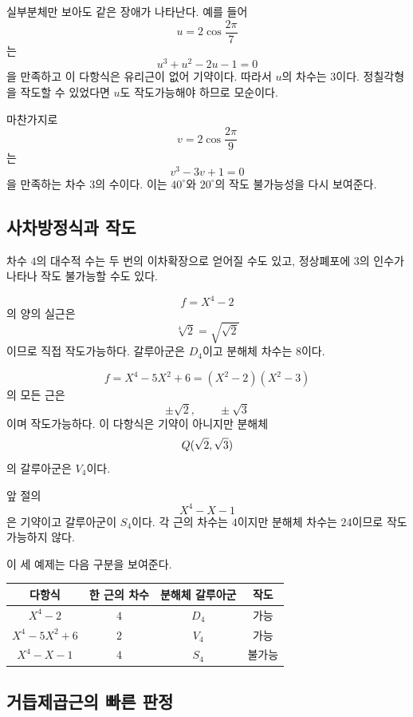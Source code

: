 실부분체만 보아도 같은 장애가 나타난다. 예를 들어
\[
  u=2\cos\frac{2\pi}{7}
\]
는
\[
  u^3+u^2-2u-1=0
\]
을 만족하고 이 다항식은 유리근이 없어 기약이다. 따라서 $u$의 차수는 $3$이다. 정칠각형을 작도할 수 있었다면 $u$도 작도가능해야 하므로 모순이다.

마찬가지로
\[
  v=2\cos\frac{2\pi}{9}
\]
는
\[
  v^3-3v+1=0
\]
을 만족하는 차수 $3$의 수이다. 이는 $40^\circ$와 $20^\circ$의 작도 불가능성을 다시 보여준다.

\subsection{사차방정식과 작도}

차수 $4$의 대수적 수는 두 번의 이차확장으로 얻어질 수도 있고, 정상폐포에 $3$의 인수가 나타나 작도 불가능할 수도 있다.

\begin{example}
\[
  f=X^4-2
\]
의 양의 실근은
\[
  \sqrt[4]2=\sqrt{\sqrt2}
\]
이므로 직접 작도가능하다. 갈루아군은 $D_4$이고 분해체 차수는 $8$이다.
\end{example}

\begin{example}
\[
  f=X^4-5X^2+6=(X^2-2)(X^2-3)
\]
의 모든 근은
\[
  \pm\sqrt2,\qquad \pm\sqrt3
\]
이며 작도가능하다. 이 다항식은 기약이 아니지만 분해체
\[
  Q(\sqrt2,\sqrt3)
\]
의 갈루아군은 $V_4$이다.
\end{example}

\begin{example}[차수 $4$의 비작도가능근]
앞 절의
\[
  X^4-X-1
\]
은 기약이고 갈루아군이 $S_4$이다. 각 근의 차수는 $4$이지만 분해체 차수는 $24$이므로 작도가능하지 않다.
\end{example}

이 세 예제는 다음 구분을 보여준다.
\begin{center}
\renewcommand{\arraystretch}{1.2}
\begin{tabular}{cccc}
\toprule
다항식 & 한 근의 차수 & 분해체 갈루아군 & 작도 \\
\midrule
$X^4-2$ & $4$ & $D_4$ & 가능 \\
$X^4-5X^2+6$ & $2$ & $V_4$ & 가능 \\
$X^4-X-1$ & $4$ & $S_4$ & 불가능 \\
\bottomrule
\end{tabular}
\end{center}

\subsection{거듭제곱근의 빠른 판정}

